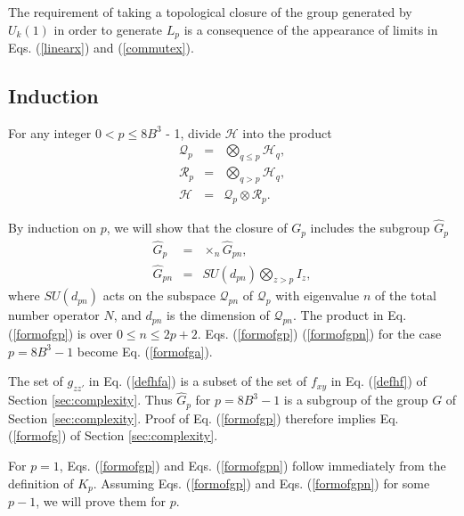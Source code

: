 \documentclass[twocolumn,amsmath,amssymb]{revtex4-1}
\begin{document}
The requirement of taking a topological closure of the
group generated by $U_k(1)$ in order to generate $L_p$
is a consequence of the appearance of limits in 
Eqs. (\ref{linearx}) and (\ref{commutex}).

\subsection{\label{app:induction} Induction}

For any integer $0 < p \le 8 B^3$ - 1,
divide $\mathcal{H}$ into the product
\begin{subequations}
\begin{eqnarray}
\label{defqa}
\mathcal{Q}_p & = & \bigotimes_{q \le p} \mathcal{H}_q, \\
\label{defra}
\mathcal{R}_p & = & \bigotimes_{q  >  p} \mathcal{H}_q, \\
\label{splita}
\mathcal{H} & = & \mathcal{Q}_p \otimes \mathcal{R}_p.
\end{eqnarray}
\end{subequations}

By induction on $p$, we will show that the closure of
$G_p$
includes the subgroup $\hat{G}_p$
\begin{subequations}
\begin{eqnarray}
\label{formofgp}
\hat{G}_p & = & \times_n \hat{G}_{p n}, \\
\label{formofgpn}
\hat{G}_{p n} & = & SU(d_{p n}) \bigotimes_{z > p} I_z,
\end{eqnarray}
\end{subequations}
where $SU(d_{p n})$ acts on the subspace $\mathcal{Q}_{p n}$ of $\mathcal{Q}_p$
with eigenvalue $n$ of the total number operator $N$, and 
$d_{p n}$ is the dimension of $\mathcal{Q}_{p n}$. 
The product in Eq. (\ref{formofgp})
is over $0 \le n \le 2 p + 2$.
Eqs. (\ref{formofgp})
(\ref{formofgpn}) for the case $p = 8B^3-1$ become Eq. (\ref{formofga}). 

The set of $g_{zz'}$ in Eq. (\ref{defhfa}) is a subset of the set of
$f_{xy}$ in Eq. (\ref{defhf}) of Section \ref{sec:complexity}.
Thus $\hat{G}_p$ for $p = 8B^3-1$ is a subgroup of the group
$G$ of Section \ref{sec:complexity}. Proof of Eq. (\ref{formofgp})
therefore implies Eq. (\ref{formofg}) of Section \ref{sec:complexity}.

For $p = 1$, Eqs. (\ref{formofgp}) and Eqs. (\ref{formofgpn})
follow immediately from the definition of $K_p$. 
Assuming Eqs. (\ref{formofgp}) and Eqs. (\ref{formofgpn}) for
some $p - 1$, we will prove them for $p$.
\end{document}
